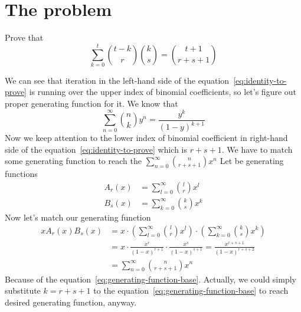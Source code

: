 ﻿\documentclass{article}
\begin{document}
    \section{The problem}\label{sec:the-problem}
    Prove that
    \begin{equation}
        \sum_{k=0}^{t} \binom{t-k}{r} \binom{k}{s} = \binom{t+1}{r+s+1}\label{eq:identity-to-prove}
    \end{equation}

    We can see that iteration in the left-hand side of the equation~\eqref{eq:identity-to-prove} is running
    over the upper index of binomial coefficients, so let's figure out proper generating function for it.
    We know that
    \begin{equation}
        \sum_{n=0}^{\infty} \binom{n}{k} y^n = \frac{y^k}{(1-y)^{k+1}}\label{eq:generating-function-base}
    \end{equation}
    Now we keep attention to the lower index of binomial coefficient in right-hand side
    of the equation~\eqref{eq:identity-to-prove} which is $r+s+1$.
    We have to match some generating function to reach the $\sum_{n=0}^{\infty} \binom{n}{r+s+1} x^n$
    Let be generating functions
    \begin{align*}
        A_r(x) &= \sum_{l=0}^{\infty} \binom{l}{r} x^l\\
        B_s(x) &= \sum_{k=0}^{\infty} \binom{k}{s} x^k
    \end{align*}
    Now let's match our generating function
    \begin{align*}
        x A_r(x) B_s(x)
        &= x \cdot \left( \sum_{l=0}^{\infty} \binom{l}{r} x^l \right) \cdot \left( \sum_{k=0}^{\infty} \binom{k}{s} x^k \right) \\
        &= x \cdot \frac{x^r}{(1-x)^{r+1}} \cdot \frac{x^s}{(1-x)^{s+1}} = \frac{x^{r+s+1}}{(1-x)^{r+s+2}} \\
        &= \sum_{n=0}^{\infty} \binom{n}{r+s+1} x^n
    \end{align*}
    Because of the equation~\eqref{eq:generating-function-base}.
    Actually, we could simply substitute $k=r+s+1$ to the equation~\eqref{eq:generating-function-base} to reach desired
    generating function, anyway.
\end{document}
